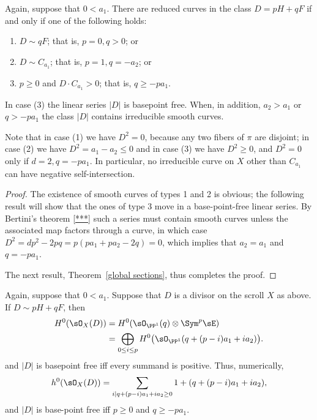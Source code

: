 \begin{theorem}\label{where are the curves?} Again, suppose that $0<a_{1}$.
There are reduced  curves in the class $D = pH+qF$ if and only if one of the following holds:

\begin{enumerate}
\item $D\sim qF$; that is, $p=0, q>0$; or
\item $D\sim C_{a_{1}}$; that is, $p=1, q=-a_{2}$; or
\item $p\geq 0$ and $D\cdot C_{a_{1}}> 0$; that is, $q \geq -pa_1.$
\end{enumerate}
In case (3) the linear series $|D|$ is basepoint free. When, in addition, $a_2>a_1$ or $q>-pa_1$ the class $|D|$ contains irreducible smooth curves.
\end{theorem}

Note that in case (1) we have $D^{2} = 0$, because any two fibers of $\pi$ are disjoint; in case (2) we have $D^{2}= a_{1}-a_{2}\leq 0$ and in case (3) we have $D^{2}\geq 0$, and $D^2=0$ only if
$d=2, q = -pa_1$. In particular, no irreducible curve
on $X$ other than $C_{a_1}$ can have negative self-intersection.

\begin{proof}
The existence of smooth curves of types 1 and 2 is obvious; the following result will show that
the ones of type 3 move in a base-point-free linear series. By Bertini's theorem \ref{***} such a series must contain smooth curves unless the associated map factors through a curve, in which case $D^2 = dp^2-2pq = p(pa_1+pa_2 -2 q) = 0$, which implies that $a_2=a_1$ and $q= -pa_1$.

The next result, Theorem~\ref{global sections}, thus completes the proof.
\end{proof}

\begin{theorem}\label{global sections} Again, suppose that $0<a_{1}$.
Suppose that $D$ is a divisor on the scroll $X$ as above. If $D \sim pH+qF$, then 
\begin{align*}
 H^{0}(\sO_{X}(D)) &= H^{0}(\sO_{\PP^{1}}(q) \otimes \Sym^{p} \sE)\\
 &= 
\bigoplus_{0\leq i\leq p}H^{0}\bigl(\sO_{\PP^{1}}(q + (p-i)a_{1}+i a_{2})\bigr).
\end{align*}
and $|D|$ is basepoint free iff every summand is positive.
Thus, numerically,
$$
h^{0}(\sO_{X}(D)) = 
\sum_{i \mid q+(p-i)a_{1}+i a_{2} \geq 0}1+(q + (p-i)a_{1}+i a_{2}),
$$
and
$|D|$ is base-point free iff $p\geq 0$ and $q\geq -pa_{1}$.
\end{theorem}


